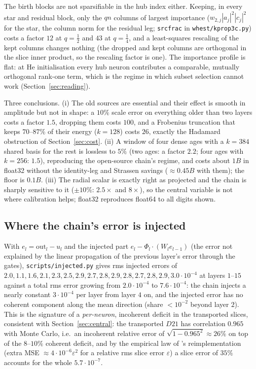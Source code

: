The birth blocks are not sparsifiable in the hub index either. Keeping, in every star and residual block, only
the $qn$ columns of largest importance ($w_{2,j}|a_j|^2|c_j|^2$ for the star, the column norm for the residual
leg; \texttt{srcfrac} in \texttt{whest/kprop3c.py}) costs a factor $12$ at $q=\tfrac12$ and $43$ at
$q=\tfrac14$, and a least-squares rescaling of the kept columns changes nothing (the dropped and kept columns
are orthogonal in the slice inner product, so the rescaling factor is one). The importance profile is flat:
at He initialisation every hub neuron contributes a comparable, mutually orthogonal rank-one term, which is the
regime in which subset selection cannot work (Section~\ref{sec:reading}).

Three conclusions. (i) The old sources are essential and their effect is smooth in amplitude but not in shape: a
$10\%$ scale error on everything older than two layers costs a factor $1.5$, dropping them costs $100$, and a
Frobenius truncation that keeps $70$--$87\%$ of their energy ($k=128$) costs $26$, exactly the Hadamard
obstruction of Section~\ref{sec:cost}. (ii) A window of four dense ages with a $k=384$ shared basis for the rest is
lossless to $5\%$ (two ages: a factor $2.2$; four ages with $k=256$: $1.5$), reproducing the open-source chain's regime, and costs about $1B$ in float32 without the
identity-leg and Strassen savings ($\approx0.45B$ with them); the floor is $0.1B$. (iii) The radial scalar is
exactly right as projected and the chain is sharply sensitive to it ($\pm10\%$: $2.5\times$ and $8\times$), so the
central variable is not where calibration helps; float32 reproduces float64 to all digits shown.

\subsection{Where the chain's error is injected}
With $e_l=\mathrm{out}_l-u_l$ and the injected part $e_l-\Phi_l\!\cdot\!(W_le_{l-1})$ (the error not explained by
the linear propagation of the previous layer's error through the gates), \texttt{scripts/injected.py} gives rms
injected errors of $2.0,1.1,1.6,2.1,2.3,2.5,2.9,2.7,2.8,2.9,2.8,2.7,2.8,2.9,3.0\cdot10^{-4}$ at layers $1$--$15$
against a total rms error growing from $2.0\cdot10^{-4}$ to $7.6\cdot10^{-4}$: the chain injects a nearly constant
$3\cdot10^{-4}$ per layer from layer $4$ on, and the injected error has no coherent component along the mean
direction (share $<10^{-2}$ beyond layer $2$). This is the signature of a \emph{per-neuron}, incoherent deficit
in the transported slices, consistent with Section~\ref{sec:central}: the transported $D21$ has correlation
$0.965$ with Monte Carlo, i.e.\ an incoherent relative error of $\sqrt{1-0.965^2}\approx26\%$ on top of the
$8$--$10\%$ coherent deficit, and by the empirical law of \cite{Wu}'s reimplementation (extra MSE
$\approx4\cdot10^{-6}\varepsilon^2$ for a relative rms slice error $\varepsilon$) a slice error of $35\%$ accounts for
the whole $5.7\cdot10^{-7}$.

